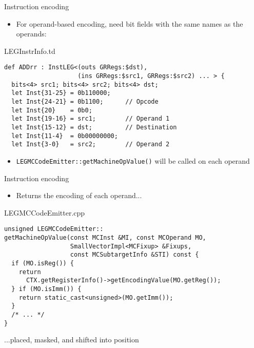 
\begin{frame}[fragile]{Instruction encoding}

\begin{itemize}
    \item For operand-based encoding, need bit fields with the same names as the operands:
\end{itemize}

\begin{block}{LEGInstrInfo.td}
\begin{lstlisting}
def ADDrr : InstLEG<(outs GRRegs:$dst),
                    (ins GRRegs:$src1, GRRegs:$src2) ... > {
  bits<4> src1; bits<4> src2; bits<4> dst;
  let Inst{31-25} = 0b110000;
  let Inst{24-21} = 0b1100;      // Opcode
  let Inst{20}    = 0b0;
  let Inst{19-16} = src1;        // Operand 1
  let Inst{15-12} = dst;         // Destination
  let Inst{11-4}  = 0b00000000;
  let Inst{3-0}   = src2;        // Operand 2
\end{lstlisting}
\end{block}

\begin{itemize}
    \item \texttt{LEGMCCodeEmitter::getMachineOpValue()} will be called on each operand
\end{itemize}

\end{frame}


\begin{frame}[fragile]{Instruction encoding}

\begin{itemize}
    \item Returns the encoding of each operand...
\end{itemize}

\begin{block}{LEGMCCodeEmitter.cpp}
\begin{lstlisting}
unsigned LEGMCCodeEmitter::
getMachineOpValue(const MCInst &MI, const MCOperand MO,
                  SmallVectorImpl<MCFixup> &Fixups,
                  const MCSubtargetInfo &STI) const {
  if (MO.isReg()) {
    return
      CTX.getRegisterInfo()->getEncodingValue(MO.getReg());
  } if (MO.isImm()) {
    return static_cast<unsigned>(MO.getImm());
  }
  /* ... */
}
\end{lstlisting}
\end{block}

...placed, masked, and shifted into position

\end{frame}

